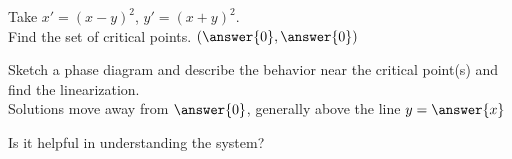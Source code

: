 \documentclass{ximera}
\begin{document}

\begin{exercise}
    Take $x'=(x-y)^2$, \enspace $y'=(x+y)^2$. \\
    Find the set of critical points. $\left(\answer{0}, \answer{0}\right)$
    \begin{problem}
        Sketch a phase diagram and describe the behavior near the critical point(s) and find the linearization.\\
        Solutions move away from $\answer{0}$, generally above the line $y=\answer{x}$
        \begin{feedback}[correct]
            Is it helpful in understanding the system?
        \end{feedback}
    \end{problem}
\end{exercise}
\end{document}
